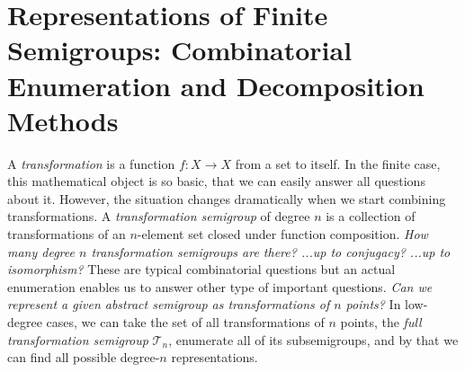 \documentclass{amsart}
\newcommand{\T}{\mathcal T}
\begin{document}
\section*{Representations of Finite Semigroups: Combinatorial Enumeration and Decomposition Methods}

A \emph{transformation} is a function $f:X\rightarrow X$ from a set to itself.
In the finite case, this mathematical object is so basic, that we can easily answer all questions about it.
However, the situation changes dramatically when we start combining transformations.
A \emph{transformation semigroup} of degree $n$ is a collection of transformations of an $n$-element set closed under function composition.
\emph{How many degree $n$ transformation semigroups are there? ...up to conjugacy? ...up to isomorphism?}
These are typical combinatorial questions but an actual enumeration enables us to answer other type of important questions.
\emph{Can we represent a given abstract semigroup as transformations of $n$ points?}
In low-degree cases,  we can take the set of all transformations of $n$ points, the \emph{full transformation semigroup} $\T_n$, enumerate all of its subsemigroups, and by that we can find all possible degree-$n$ representations. 
\end{document}
